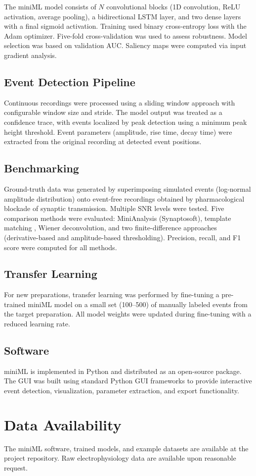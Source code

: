 \documentclass[11pt]{article}
\begin{document}
The miniML model consists of $N$ convolutional blocks (1D convolution, ReLU activation, average pooling), a bidirectional LSTM layer, and two dense layers with a final sigmoid activation. Training used binary cross-entropy loss with the Adam optimizer. Five-fold cross-validation was used to assess robustness. Model selection was based on validation AUC. Saliency maps were computed via input gradient analysis.

\subsection{Event Detection Pipeline}

Continuous recordings were processed using a sliding window approach with configurable window size and stride. The model output was treated as a confidence trace, with events localized by peak detection using a minimum peak height threshold. Event parameters (amplitude, rise time, decay time) were extracted from the original recording at detected event positions.

\subsection{Benchmarking}

Ground-truth data was generated by superimposing simulated events (log-normal amplitude distribution) onto event-free recordings obtained by pharmacological blockade of synaptic transmission. Multiple SNR levels were tested. Five comparison methods were evaluated: MiniAnalysis (Synaptosoft), template matching \citep{Clements1997}, Wiener deconvolution, and two finite-difference approaches (derivative-based and amplitude-based thresholding). Precision, recall, and F1 score were computed for all methods.

\subsection{Transfer Learning}

For new preparations, transfer learning was performed by fine-tuning a pre-trained miniML model on a small set (100--500) of manually labeled events from the target preparation. All model weights were updated during fine-tuning with a reduced learning rate.

\subsection{Software}

miniML is implemented in Python and distributed as an open-source package. The GUI was built using standard Python GUI frameworks to provide interactive event detection, visualization, parameter extraction, and export functionality.

\section*{Data Availability}
The miniML software, trained models, and example datasets are available at the project repository. Raw electrophysiology data are available upon reasonable request.



\end{document}
